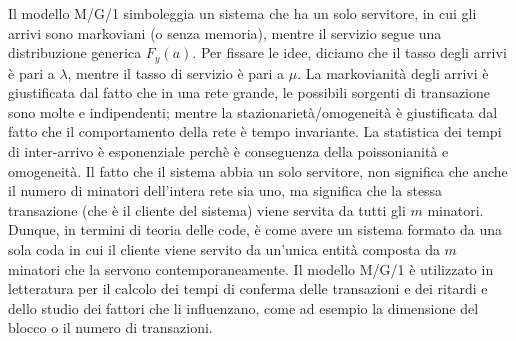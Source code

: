 Il modello M/G/1 simboleggia un sistema che ha un solo servitore, in cui gli arrivi sono markoviani (o senza memoria), mentre il servizio segue una distribuzione generica $F_y(a)$. Per fissare le idee, diciamo che il tasso degli arrivi \`e pari a $\lambda$, mentre il tasso di servizio \`e pari a $\mu$.
La markovianità degli arrivi \`e giustificata dal fatto che in una rete grande, le possibili sorgenti di transazione sono molte e indipendenti; mentre la stazionarietà/omogeneità \`e giustificata dal fatto che il comportamento della rete \`e tempo invariante. La statistica dei tempi di inter-arrivo \`e esponenziale perch\`e \`e conseguenza della poissonianità e omogeneità.
Il fatto che il sistema abbia un solo servitore, non significa che anche il numero di minatori dell'intera rete sia uno, ma significa che la stessa transazione (che \`e il cliente del sistema) viene servita da tutti gli $m$ minatori. Dunque, in termini di teoria delle code, \`e come avere un sistema formato da una sola coda in cui il cliente viene servito da un'unica entità composta da $m$ minatori che la servono contemporaneamente.
Il modello M/G/1 \`e utilizzato in letteratura per il calcolo dei tempi di conferma delle transazioni e dei ritardi e dello studio dei fattori che li influenzano, come ad esempio la dimensione del blocco o il numero di transazioni.

